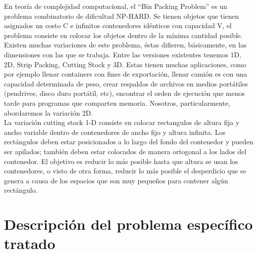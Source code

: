 \documentclass[letter,10pt]{article}
\begin{document}
En teoría de complejidad computacional, el ``Bin Packing Problem'' es un problema combinatorio de dificultad NP-HARD. Se tienen objetos que
tienen asignados un costo C e infinitos contenedores idénticos con capacidad V, el problema consiste en colocar los objetos dentro de la
mínima cantidad posible.\\
\indent Existen muchas variaciones de este problema, éstas difieren, básicamente, en las dimensiones con las que se trabaja.
Entre las versiones existentes tenemos 1D, 2D, Strip Packing, Cutting Stock y 3D. Estas tienen muchas aplicaciones, como por ejemplo llenar
containers con fines de exportación, llenar camión es con una capacidad determinada de peso, crear respaldos de archivos en medios portátiles
(pendrives, disco duro portátil, etc), encontrar el orden de ejecución que menos tarde para programas que comparten memoria. Nosotros,
particularmente, abordaremos la variación 2D.\\
\indent La variaci\'on cutting stock 1-D consiste en colocar rectangulos
de altura fija y ancho variable dentro de contenedores de ancho fijo y
altura infinita. Los rect\'angulos deben estar posicionados a lo largo del
fondo del contenedor y pueden ser apilados; tambi\'en deben estar
colocados de manera ortogonal a los lados del contenedor. El objetivo es
reducir lo m\'as posible hasta que altura se usan los contenedores, o
visto de otra forma, reducir lo m\'as posible el desperdicio que se
genera a causa de los espacios que son muy peque\~nos para contener
alg\'un rect\'angulo.

\section{Descripción del problema espec\'ifico tratado}
\end{document}
